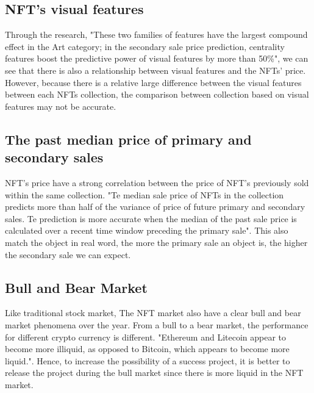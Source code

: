 \subsection{NFT’s visual features}

Through the research, "These two families of features have the largest compound effect in the Art category; in the secondary sale price prediction, centrality features boost the predictive power of visual features by more than 50\%"\cite{nadini2021mapping}, we can see that there is also a relationship between visual features and the NFTs' price. However, because there is a relative large difference between the visual features between each NFTs collection, the comparison between collection based on visual features may not be accurate.

\subsection{The past median price of primary and secondary sales}

NFT's price have a strong correlation between the price of NFT's previously sold within the same collection. "Te median sale price of NFTs in the collection predicts more than half of the variance of price of future primary and secondary sales. Te prediction is more accurate when the median of the past sale price is calculated over a recent time window preceding the primary sale"\cite{nadini2021mapping}. This also match the object in real word, the more the primary sale an object is, the higher the secondary sale we can expect. 

\subsection{Bull and Bear Market}
Like traditional stock market, The NFT market also have a clear bull and bear market phenomena over the year. From a bull to a bear market, the performance for different crypto currency is different. "Ethereum and Litecoin appear to become more illiquid, as opposed to Bitcoin, which appears to become more liquid."\cite{Bull_Bear}. Hence, to increase the possibility of a success project, it is better to release the project during the bull market since there is more liquid in the NFT market.






